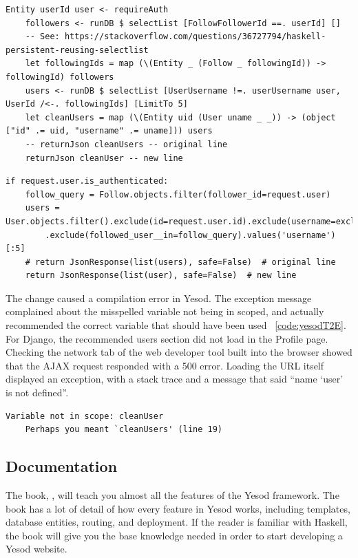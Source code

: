 \begin{lstlisting}[caption={Yesod Code Change},label={code:yesodVarT2}]
	Entity userId user <- requireAuth
	followers <- runDB $ selectList [FollowFollowerId ==. userId] []
	-- See: https://stackoverflow.com/questions/36727794/haskell-persistent-reusing-selectlist
	let followingIds = map (\(Entity _ (Follow _ followingId)) -> followingId) followers
	users <- runDB $ selectList [UserUsername !=. userUsername user, UserId /<-. followingIds] [LimitTo 5]
	let cleanUsers = map (\(Entity uid (User uname _ _)) -> (object ["id" .= uid, "username" .= uname])) users
	-- returnJson cleanUsers -- original line
	returnJson cleanUser -- new line
\end{lstlisting}

\begin{lstlisting}[caption={Django Code Change},label={code:djangoVarT2}]
	if request.user.is_authenticated:
	follow_query = Follow.objects.filter(follower_id=request.user)
	users = User.objects.filter().exclude(id=request.user.id).exclude(username=excluded_username)\
		.exclude(followed_user__in=follow_query).values('username')[:5]
	# return JsonResponse(list(users), safe=False)  # original line
	return JsonResponse(list(user), safe=False)  # new line
\end{lstlisting}

The change caused a compilation error in Yesod. The exception message complained
about the misspelled variable not being in scoped, and actually recommended the
correct variable that should have been used ~\ref{code:yesodT2E}.
For Django, the recommended users section did not load in the Profile page.
Checking the network tab of the web developer tool built into the browser
showed that the AJAX request responded with a 500 error. Loading the URL
itself displayed an exception, with a stack trace and a message that said 
``name `user' is not defined''.

\begin{lstlisting}[caption={Yesod Exception Message},label={code:yesodT2E}]
	Variable not in scope: cleanUser
	Perhaps you meant `cleanUsers' (line 19)
\end{lstlisting}

\subsection{Documentation}

The book, , will teach you almost all the features of the
Yesod framework. The book has a lot of detail of how every feature in Yesod works,
including templates, database entities, routing, and deployment. If the reader
is familiar with Haskell, the book will give you the base knowledge needed
in order to start developing a Yesod website.

